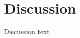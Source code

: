 \documentclass[main.tex]{subfiles}
\begin{document}
\section*{Discussion}

Discussion text
\end{document}
